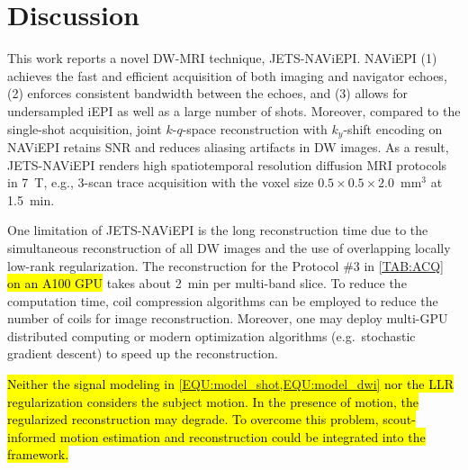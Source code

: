 \documentclass[preprint,12pt,authoryear,review]{elsarticle}
\begin{document}

    \clearpage

    \section{Discussion}
    \label{SEC:Disc}

    This work reports a novel DW-MRI technique, JETS-NAViEPI.
    NAViEPI (1) achieves the fast and efficient acquisition of
    both imaging and navigator echoes,
    (2) enforces consistent bandwidth between the echoes, and
    (3) allows for undersampled iEPI as well as a large number of shots.
    Moreover, compared to the single-shot acquisition,
    joint $k$-$q$-space reconstruction
    with $k_y$-shift encoding on NAViEPI
    retains SNR and reduces aliasing artifacts in DW images.
    As a result, JETS-NAViEPI renders high spatiotemporal resolution
    diffusion MRI protocols in \SI{7}{\tesla},
    e.g., 3-scan trace acquisition with the voxel size
    $0.5\times0.5\times2.0$~mm$^3$ at \SI{1.5}{\minute}.

    One limitation of JETS-NAViEPI is the long reconstruction time
    due to the simultaneous reconstruction of all DW images and
    the use of overlapping locally low-rank regularization.
    The reconstruction for the Protocol \#3 in \cref{TAB:ACQ}
    \hl{on an A100 GPU} takes about \SI{2}{\minute} per multi-band slice.
    To reduce the computation time, coil compression algorithms
    \citep{buehrer_2007_scc,huang_2008_scc}
    can be employed to reduce the number of coils for image reconstruction.
    Moreover, one may deploy multi-GPU distributed computing
    or modern optimization algorithms
    (e.g.~stochastic gradient descent) \citep{ong_2020_extreme}
    to speed up the reconstruction.

    \hl{Neither the signal modeling in
    \mbox{\cref{EQU:model_shot,EQU:model_dwi}}
    nor the LLR regularization considers the subject motion.
    In the presence of motion, the regularized reconstruction may degrade.
    To overcome this problem, scout-informed motion estimation
    and reconstruction \mbox{\citep{polak_2022_samer}}
    could be integrated into the framework.}
\end{document}
